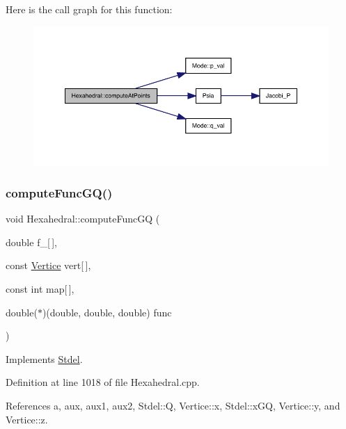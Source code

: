 Here is the call graph for this function\+:
\nopagebreak
\begin{figure}[H]
\begin{center}
\leavevmode
\includegraphics[width=350pt]{classHexahedral_a49a57b40396ae96449b3a2aa765b1e8b_cgraph}
\end{center}
\end{figure}
\mbox{\label{classHexahedral_a016d039e52e05f96f2db7ed13e78bcdc}} 
\subsubsection{\texorpdfstring{compute\+Func\+G\+Q()}{computeFuncGQ()}}
{\footnotesize\ttfamily void Hexahedral\+::compute\+Func\+GQ (\begin{DoxyParamCaption}\item[{double}]{f\+\_\+\mbox{[}$\,$\mbox{]},  }\item[{const \hyperlink{structVertice}{Vertice}}]{vert\mbox{[}$\,$\mbox{]},  }\item[{const int}]{map\mbox{[}$\,$\mbox{]},  }\item[{double($\ast$)(double, double, double)}]{func }\end{DoxyParamCaption})\hspace{0.3cm}{\ttfamily [virtual]}}



Implements \hyperlink{classStdel_a59195ad1ce9b90ef83fd935698dc3305}{Stdel}.



Definition at line 1018 of file Hexahedral.\+cpp.



References a, aux, aux1, aux2, Stdel\+::Q, Vertice\+::x, Stdel\+::x\+GQ, Vertice\+::y, and Vertice\+::z.

